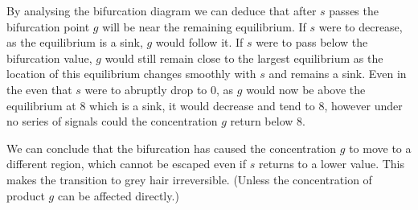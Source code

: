 \documentclass[a4paper, 11pt]{article}
\begin{document}
\begin{enumerate}[label=(\alph*)]
By analysing the bifurcation diagram we can deduce that after $s$ passes the bifurcation point $g$ will be near the remaining equilibrium. If $s$ were to decrease, as the equilibrium is a sink, $g$ would follow it. If $s$ were to pass below the bifurcation value, $g$ would still remain close to the largest equilibrium as the location of this equilibrium changes smoothly with $s$ and remains a sink. Even in the even that $s$ were to abruptly drop to $0$, as $g$ would now be above the equilibrium at $8$ which is a sink, it would decrease and tend to $8$, however under no series of signals could the concentration $g$ return below $8$. 

We can conclude that the bifurcation has caused the concentration $g$ to move to a different region, which cannot be escaped even if $s$ returns to a lower value. This makes the transition to grey hair irreversible. (Unless the concentration of product $g$ can be affected directly.) 
\end{enumerate}
\end{document}

